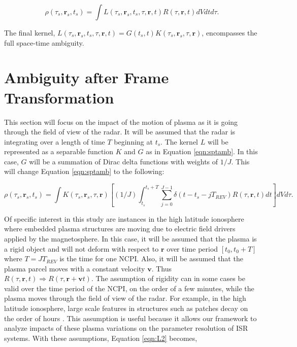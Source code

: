 \begin{equation}
\label{eqn:sptamb}
	\rho(\tau_s,\mathbf{r}_s,t_s) =\int L(\tau_s,\mathbf{r}_s,t_s,\tau,\mathbf{r},t)R(\tau,\mathbf{r},t)dVdtd\tau.
\end{equation}

\noindent The final kernel, $L(\tau_s,\mathbf{r}_s,t_s,\tau,\mathbf{r},t) = G(t_s,t)K(\tau_s,\mathbf{r}_s,\tau,\mathbf{r})$, encompasses the full space-time ambiguity.

\section{Ambiguity after Frame Transformation}
\label{sec:frametrans}

This section will focus on the impact of the motion of plasma as it is going through the field of view of the radar. It will be assumed that the radar is integrating over a length of time $T$ beginning at $t_s$. The kernel $L$ will be represented as a separable function $K$ and $G$ as in Equation \ref{eqn:sptamb}. In this case, $G$ will be a summation of Dirac delta functions with weights of $1/J$. This will change Equation \ref{eqn:sptamb} to the following:

\begin{equation}
\label{eqn:L2}
\rho(\tau_s,\mathbf{r}_s,t_s) = \int K(\tau_s,\mathbf{r}_s,\tau,\mathbf{r}) \left[(1/J)\int_{t_s}^{t_s+T} \displaystyle \sum_{j=0}^{J-1} \delta(t-t_s-jT_{REV})R(\tau,\mathbf{r},t) dt\right] dVd\tau.
\end{equation}

Of specific interest in this study are instances in the high latitude ionosphere where embedded plasma structures are moving due to electric field drivers applied by the magnetosphere. In this case, it will be assumed that the plasma is a rigid object and will not deform with respect to $\mathbf{r}$ over time period $[t_0,t_0+T]$ where $T=JT_{REV}$ is the time for one NCPI. Also, it will be assumed that the plasma parcel moves with a constant velocity $\mathbf{v}$. Thus $R(\tau,\mathbf{r},t)\Rightarrow R(\tau,\mathbf{r}+\mathbf{v}t)$. The assumption of rigidity can in some cases be valid over the time period of the NCPI, on the order of a few minutes, while the plasma moves through the field of view of the radar. For example, in the high latitude ionosphere, large scale features in structures such as patches decay on the order of hours \cite{Tsunoda:1988ul}. This assumption is useful because it allows our framework to analyze impacts of these plasma variations on the parameter resolution of ISR systems. With these assumptions, Equation \ref{eqn:L2} becomes,


